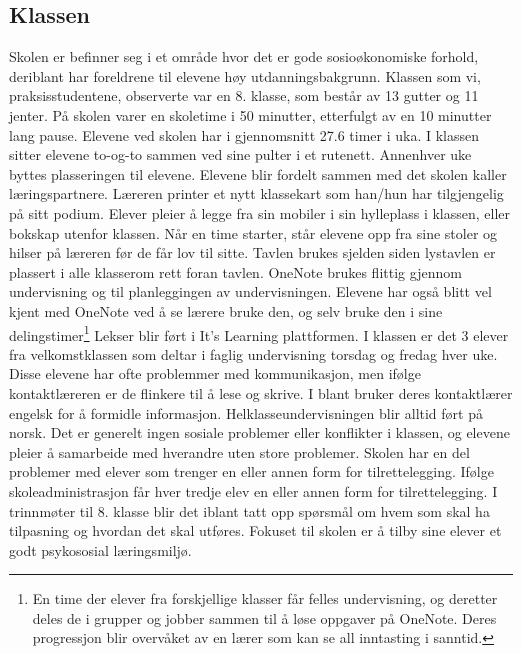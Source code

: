 \documentclass[main.tex]{subfiles}
\begin{document}
\subsection*{Klassen}
Skolen er befinner seg i et område hvor det er gode sosioøkonomiske forhold, deriblant har foreldrene 
til elevene høy utdanningsbakgrunn. Klassen som vi, praksisstudentene, observerte var en 8. klasse, som
består av 13 gutter og 11 jenter. På skolen varer en skoletime i 50 minutter, etterfulgt av en 
10 minutter lang pause. Elevene ved skolen har i gjennomsnitt 27.6 timer i uka. I klassen sitter 
elevene to-og-to sammen ved sine pulter i et rutenett. Annenhver uke byttes plasseringen til elevene. 
Elevene blir fordelt sammen med det skolen kaller læringspartnere. Læreren printer 
et nytt klassekart som han/hun har tilgjengelig på sitt podium. Elever pleier å legge fra sin mobiler i
sin hylleplass i klassen, eller bokskap utenfor klassen. Når en time starter, står elevene opp fra sine 
stoler og hilser på læreren før de får lov til sitte. Tavlen brukes sjelden siden lystavlen er plassert
i alle klasserom rett foran tavlen. OneNote brukes flittig gjennom undervisning og til planleggingen av 
undervisningen. Elevene har også blitt vel kjent med OneNote ved å se lærere bruke den, og selv bruke 
den i sine delingstimer\footnote{En time der elever fra forskjellige klasser får felles undervisning, 
og deretter deles de i grupper og jobber sammen til å løse oppgaver på OneNote. Deres progressjon 
blir overvåket av en lærer som kan se all inntasting i sanntid.} Lekser blir ført i It’s Learning plattformen. 
I klassen er det 3 elever fra velkomstklassen som deltar i faglig undervisning torsdag og fredag hver uke. 
Disse elevene har ofte problemmer med kommunikasjon, men ifølge kontaktlæreren er de flinkere til å lese 
og skrive. I blant bruker deres kontaktlærer engelsk for å formidle informasjon. Helklasseundervisningen 
blir alltid ført på norsk. Det er generelt ingen sosiale problemer eller konflikter i klassen, og elevene 
pleier å samarbeide med hverandre uten store problemer. Skolen har en del problemer med elever som trenger 
en eller annen form for tilrettelegging. Ifølge skoleadministrasjon får hver tredje elev en eller annen 
form for tilrettelegging. I trinnmøter til 8. klasse blir det iblant tatt opp spørsmål om hvem som skal ha 
tilpasning og hvordan det skal utføres. Fokuset til skolen er å tilby sine elever et godt psykososial 
læringsmiljø.
\newline
\end{document}
